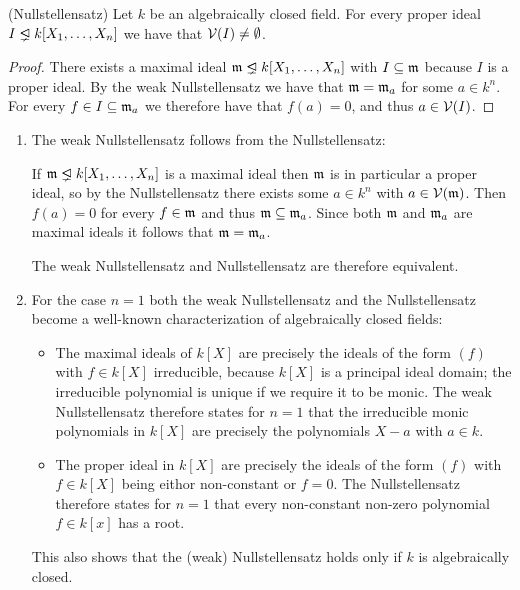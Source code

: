 \begin{corollary}(Nullstellensatz)
  Let $k$ be an algebraically closed field.
  For every proper ideal $I \idealneq k[X_1, \dotsc, X_n]$ we have that $\mathcal{V}(I) \neq \emptyset$.
\end{corollary}


\begin{proof}
  There exists a maximal ideal $\mf{m} \idealneq k[X_1, \dotsc, X_n]$ with $I \subseteq \mathfrak{m}$ because $I$ is a proper ideal.
  By the weak Nullstellensatz we have that $\mathfrak{m} = \mathfrak{m}_a$ for some $a \in k^n$.
  For every $f \in I \subseteq \mathfrak{m}_a$ we therefore have that $f(a) = 0$, and thus $a \in \mathcal{V}(I)$.
\end{proof}


\begin{remark}
  \label{remark: (weak) nullstellensatz}
  \leavevmode
  \begin{enumerate}
    \item
      The weak Nullstellensatz follows from the Nullstellensatz:
      
      If $\mf{m} \idealneq k[X_1, \dotsc, X_n]$ is a maximal ideal then $\mathfrak{m}$ is in particular a proper ideal, so by the Nullstellensatz there exists some $a \in k^n$ with $a \in \mathcal{V}(\mathfrak{m})$.
      Then $f(a) = 0$ for every $f \in \mathfrak{m}$ and thus $\mathfrak{m} \subseteq \mathfrak{m}_a$.
      Since both $\mathfrak{m}$ and $\mathfrak{m}_a$ are maximal ideals it follows that $\mathfrak{m} = \mathfrak{m}_a$.
      
      The weak Nullstellensatz and Nullstellensatz are therefore equivalent.
    \item
      For the case $n = 1$ both the weak Nullstellensatz and the Nullstellensatz become a well-known characterization of algebraically closed fields:
      \begin{itemize}
        \item
          The maximal ideals of $k[X]$ are precisely the ideals of the form $(f)$ with $f \in k[X]$ irreducible, because $k[X]$ is a principal ideal domain;
          the irreducible polynomial is unique if we require it to be monic.
          The weak Nullstellensatz therefore states for $n = 1$ that the irreducible monic polynomials in $k[X]$ are precisely the polynomials $X - a$ with $a \in k$.
        \item
          The proper ideal in $k[X]$ are precisely the ideals of the form $(f)$ with $f \in k[X]$ being eithor non-constant or $f = 0$.
          The Nullstellensatz therefore states for $n = 1$ that every non-constant non-zero polynomial $f \in k[x]$ has a root.
      \end{itemize}
      This also shows that the (weak) Nullstellensatz holds only if $k$ is algebraically closed.
      

\end{enumerate}
\end{remark}
